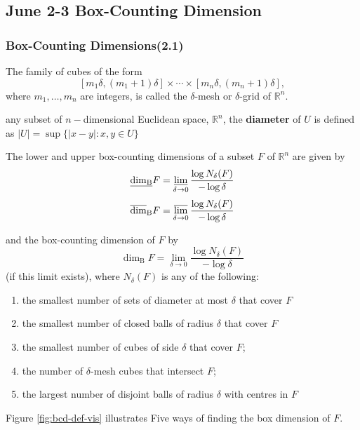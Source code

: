 \newpage

\subsection{June 2-3 Box-Counting Dimension}
\subsubsection{Box-Counting Dimensions(2.1)}

\begin{definition}
    The family of cubes of the form
$$
\left[m_{1} \delta,\left(m_{1}+1\right) \delta\right] \times \cdots \times\left[m_{n} \delta,\left(m_{n}+1\right) \delta\right],
$$
where $m_{1}, \ldots, m_{n}$ are integers, is called the $\delta$-mesh or $\delta$-grid of $\mathbb{R}^n$.
\end{definition}

\begin{definition}[Diameter]
    any subset of $n-$dimensional Euclidean space, $\mathbb{R}^n$, the \textbf{diameter} of $U$ is defined as $|U|=\sup \{|x-y|:x, y\in U\}$
\end{definition}

\begin{definition}\label{bcd-def}
    The lower and upper box-counting dimensions of a subset $F$ of $\mathbb{R}^{n}$ are given by
    $$\underline{\operatorname{dim}_{\mathrm{B}}} F=\varliminf_{\delta \rightarrow 0} \frac{\log N_{\delta}(F)}{-\log \delta}$$
    $$\overline{\operatorname{dim}}_{\mathrm{B}} F=\varlimsup_{\delta \rightarrow 0} \frac{\log N_{\delta}(F)}{-\log \delta}$$
    
and the box-counting dimension of $F$ by
$$
\operatorname{dim}_{\mathrm{B}} F=\lim _{\delta \rightarrow 0} \frac{\log N_{\delta}(F)}{-\log \delta}
$$
(if this limit exists), where $N_{\delta}(F)$ is any of the following:
\begin{enumerate}[i]
    \item the smallest number of sets of diameter at most $\delta$ that cover $F$
    \item  the smallest number of closed balls of radius $\delta$ that cover $F$
    \item  the smallest number of cubes of side $\delta$ that cover $F$;
    \item  the number of $\delta$-mesh cubes that intersect $F$;
    \item  the largest number of disjoint balls of radius $\delta$ with centres in $F$  
\end{enumerate}  
Figure \ref{fig:bcd-def-vis} illustrates Five ways of finding the box dimension of $F$.

\end{definition}



